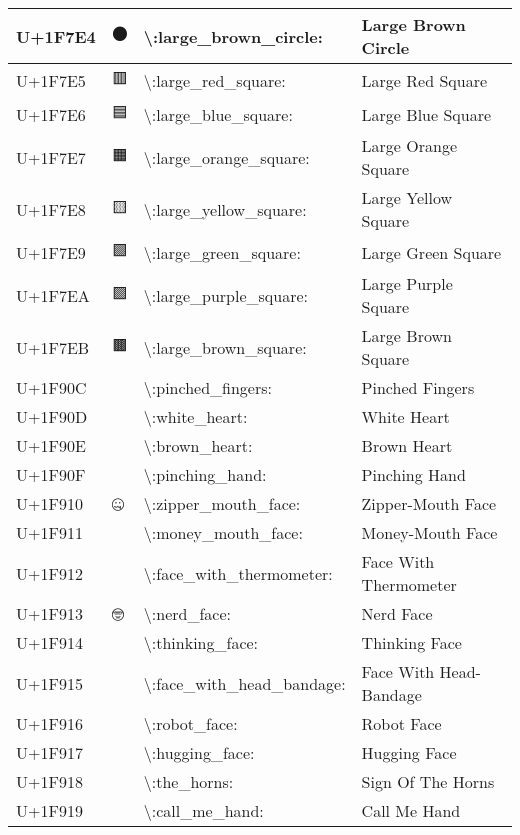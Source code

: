 \begin{table}[h]
\begin{tabulary}{\linewidth}{|L|L|L|L|}
\hline
U+1F7E4 & 🟤 & {\textbackslash}:large\_brown\_circle: & Large Brown Circle \\
\hline
U+1F7E5 & 🟥 & {\textbackslash}:large\_red\_square: & Large Red Square \\
\hline
U+1F7E6 & 🟦 & {\textbackslash}:large\_blue\_square: & Large Blue Square \\
\hline
U+1F7E7 & 🟧 & {\textbackslash}:large\_orange\_square: & Large Orange Square \\
\hline
U+1F7E8 & 🟨 & {\textbackslash}:large\_yellow\_square: & Large Yellow Square \\
\hline
U+1F7E9 & 🟩 & {\textbackslash}:large\_green\_square: & Large Green Square \\
\hline
U+1F7EA & 🟪 & {\textbackslash}:large\_purple\_square: & Large Purple Square \\
\hline
U+1F7EB & 🟫 & {\textbackslash}:large\_brown\_square: & Large Brown Square \\
\hline
U+1F90C & 🤌 & {\textbackslash}:pinched\_fingers: & Pinched Fingers \\
\hline
U+1F90D & 🤍 & {\textbackslash}:white\_heart: & White Heart \\
\hline
U+1F90E & 🤎 & {\textbackslash}:brown\_heart: & Brown Heart \\
\hline
U+1F90F & 🤏 & {\textbackslash}:pinching\_hand: & Pinching Hand \\
\hline
U+1F910 & 🤐 & {\textbackslash}:zipper\_mouth\_face: & Zipper-Mouth Face \\
\hline
U+1F911 & 🤑 & {\textbackslash}:money\_mouth\_face: & Money-Mouth Face \\
\hline
U+1F912 & 🤒 & {\textbackslash}:face\_with\_thermometer: & Face With Thermometer \\
\hline
U+1F913 & 🤓 & {\textbackslash}:nerd\_face: & Nerd Face \\
\hline
U+1F914 & 🤔 & {\textbackslash}:thinking\_face: & Thinking Face \\
\hline
U+1F915 & 🤕 & {\textbackslash}:face\_with\_head\_bandage: & Face With Head-Bandage \\
\hline
U+1F916 & 🤖 & {\textbackslash}:robot\_face: & Robot Face \\
\hline
U+1F917 & 🤗 & {\textbackslash}:hugging\_face: & Hugging Face \\
\hline
U+1F918 & 🤘 & {\textbackslash}:the\_horns: & Sign Of The Horns \\
\hline
U+1F919 & 🤙 & {\textbackslash}:call\_me\_hand: & Call Me Hand \\

\end{tabulary}
\end{table}
